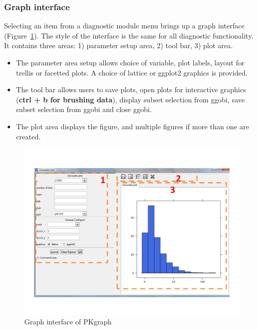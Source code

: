 \documentclass[a4paper]{article}
\begin{document}
\subsubsection{Graph interface}
Selecting an item from a diagnostic module menu brings up a graph interface (Figure~\ref{c4_s2_2}). The style of the interface is the same for all diagnostic functionality.  It contains three areas: 1) parameter setup area, 2) tool bar, 3) plot area.
\newline
\newline
\begin{itemize}
	\item The parameter area setup allows choice of variable, plot labels, layout for trellis or facetted plots. A choice of lattice or ggplot2 graphics is provided.
	\item The tool bar allows users to save plots, open plots for interactive graphics (\textbf{ctrl + b for brushing data}), display subset selection from ggobi, save subset selection from ggobi and close ggobi.
	\item The plot area displays the figure, and multiple figures if more than one are created.
\end{itemize}
\begin{figure}[h!tb] \centering
\includegraphics[scale=0.6]{c4_s2_2graph.pdf}
\caption{Graph interface of PKgraph}
\label{c4_s2_2}
\end{figure}
\end{document}
